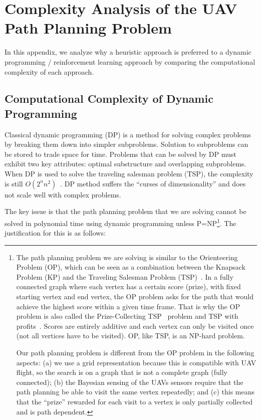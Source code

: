 \chapter{Complexity Analysis of the UAV Path Planning Problem}
\label{chap:complexity}

In this appendix, we analyze why a heuristic approach is preferred to a dynamic programming / reinforcement learning approach by comparing the computational complexity of each approach.

\section{Computational Complexity of Dynamic Programming}
\label{DPComplexity}

Classical dynamic programming (DP) is a method for solving complex problems by breaking them down into simpler subproblems. Solution to subproblems can be stored to trade space for time. Problems that can be solved by DP must exhibit two key attributes: optimal substructure and overlapping subproblems. When DP is used to solve the traveling salesman problem (TSP), the complexity is still $O(2^n n^2)$~\cite{Bellman1958Combinatorial}. DP method suffers the ``curses of dimensionality'' and does not scale well with complex problems. 

The key issue is that the path planning problem that we are solving cannot be solved in polynomial time using dynamic programming unless P=NP\footnote{The path planning problem we are solving is similar to the Orienteering Problem (OP), which can be seen as a combination between the Knapsack Problem (KP) and the Traveling Salesman Problem (TSP)~\cite{Vansteenwegen2011Orienteering}. In a fully connected graph where each vertex has a certain score (prize), with fixed starting vertex and end vertex, the OP problem asks for the path that would achieve the highest score within a given time frame. That is why the OP problem is also called the Prize-Collecting TSP~\cite{Gutin2002Traveling} problem and TSP with profits~\cite{Feillet2005Traveling}. Scores are entirely additive and each vertex can only be visited once (not all vertices have to be visited). OP, like TSP, is an NP-hard problem.

Our path planning problem is different from the OP problem in the following aspects: (a) we use a grid representation because this is compatible with UAV flight, so the search is on a graph that is not a complete graph (fully connected); (b) the Bayesian sensing of the UAVs sensors require that the path planning be able to visit the same vertex repeatedly; and (c) this means that the ``prize'' rewarded for each visit to a vertex is only partially collected and is path dependent.}. The justification for this is as follows:

